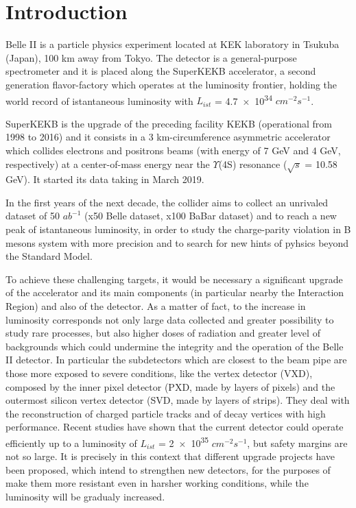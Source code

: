 

\chapter*{Introduction}

Belle II is a particle physics experiment located at KEK laboratory in Tsukuba (Japan), 100 km away from Tokyo. The detector is a general-purpose spectrometer and it is placed along the SuperKEKB accelerator, a second generation flavor-factory which operates at the luminosity frontier, holding the world record of istantaneous luminosity with $L_{ist}$ = \num{4.7e34} $cm^{-2} s^{-1}$. 

SuperKEKB is the upgrade of the preceding facility KEKB (operational from 1998 to 2016) and it consists in a 3 km-circumference asymmetric accelerator which collides electrons and positrons beams (with energy of 7 GeV and 4 GeV, respectively) at a center-of-mass energy near the $\Upsilon$(4S) resonance ($\sqrt{s}$ = 10.58 GeV). It started its data taking in March 2019.

In the first years of the next decade, the collider aims to collect  an unrivaled dataset of 50 $ab^{-1}$ (x50 Belle dataset, x100 BaBar dataset) and to reach a new peak of istantaneous luminosity, in order to study the charge-parity violation in B mesons system with more precision and to search for new hints of pyhsics beyond the Standard Model.

To achieve these challenging targets, it would be necessary a significant upgrade of the accelerator and its main components (in particular nearby the Interaction Region) and also of the detector. As a matter of fact, to the increase in luminosity corresponds not only large data collected and greater possibility to study rare processes, but also higher doses of radiation and greater level of backgrounds which could undermine the integrity and the operation of the Belle II detector.
In particular the subdetectors which are closest to the beam pipe are those more exposed to severe conditions, like the vertex detector (VXD), composed by the inner pixel detector (PXD, made by layers of pixels) and the outermost silicon vertex detector (SVD, made by layers of strips). They deal with the reconstruction of charged particle tracks and of decay vertices with high performance. Recent studies have shown that the current detector could operate efficiently up to a luminosity of $L_{ist}$ = \num{2e35} $cm^{-2} s^{-1}$, but safety margins are not so large. 
It is precisely in this context that different upgrade projects have been proposed, which intend to strengthen new detectors, for the purposes of make them more resistant even in harsher working conditions, while the luminosity will be gradualy increased. 

